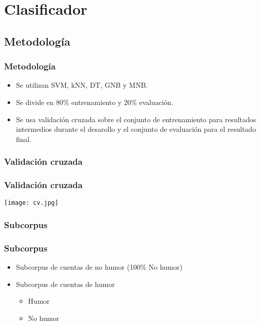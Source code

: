 \section{Clasificador}

\subsection{Metodología}
\begin{frame}
    \frametitle{Metodología}

    \begin{itemize}[<+->]
        \item Se utilizan SVM, kNN, DT, GNB y MNB.
        \item Se divide en 80\% entrenamiento y 20\% evaluación.
        \item Se usa validación cruzada sobre el conjunto de entrenamiento para resultados intermedios durante el desarollo y el conjunto de evaluación para el resultado final.
    \end{itemize}
\end{frame}

\subsubsection{Validación cruzada}
\begin{frame}
    \frametitle{Validación cruzada}
    
    \begin{center}
        \texttt{[image: cv.jpg]}
    \end{center}
\end{frame}

\subsubsection{Subcorpus}
\begin{frame}
    \frametitle{Subcorpus}

    \begin{itemize}[<+->]
        \item Subcorpus de cuentas de no humor (100\% No humor)
        \item Subcorpus de cuentas de humor
        \begin{itemize}[<+->]
            \item Humor
            \item No humor
        \end{itemize}
    \end{itemize}
\end{frame}

